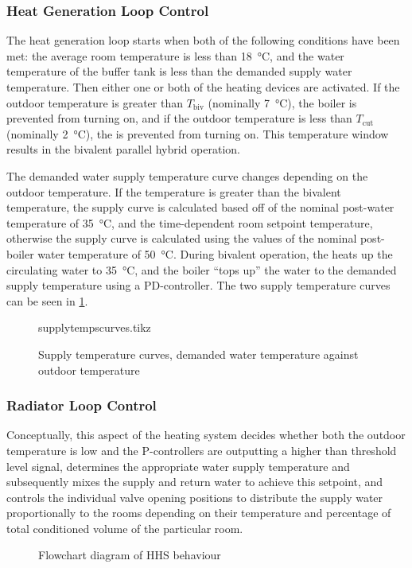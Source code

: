 \subsubsection{Heat Generation Loop Control} \label{subsubsec:heatgenloopcont}
The heat generation loop starts when both of the following conditions have been met: the average room temperature is less than \qty{18}{\celsius}, and the water temperature of the buffer tank is less than the demanded supply water temperature. Then either one or both of the heating devices are activated. If the outdoor temperature is greater than $T_\text{biv}$ (nominally \qty{7}{\celsius}), the boiler is prevented from turning on, and if the outdoor temperature is less than $T_\text{cut}$ (nominally \qty{2}{\celsius}), the \HP is prevented from turning on. This temperature window results in the bivalent parallel hybrid operation. 

The demanded water supply temperature curve changes depending on the outdoor temperature. If the temperature is greater than the bivalent temperature, the supply curve is calculated based off of the nominal post-\HP water temperature of \qty{35}{\celsius}, and the time-dependent room setpoint temperature, otherwise the supply curve is calculated using the values of the nominal post-boiler water temperature of \qty{50}{\celsius}. During bivalent operation, the \HP heats up the circulating water to \qty{35}{\celsius}, and the boiler ``tops up'' the water to the demanded supply temperature using a PD-controller. The two supply temperature curves can be seen in \cref{fig:supplytempcurves}.

\begin{figure}[htb]
    \centering
    {supplytempscurves.tikz}
    \caption{Supply temperature curves, demanded water temperature against outdoor temperature}
    \label{fig:supplytempcurves}
\end{figure}



\subsubsection{Radiator Loop Control}
Conceptually, this aspect of the heating system decides whether both the outdoor temperature is low and the P-controllers are outputting a higher than threshold level signal, determines the appropriate water supply temperature and subsequently mixes the supply and return water to achieve this setpoint, and controls the individual valve opening positions to distribute the supply water proportionally to the rooms depending on their temperature and percentage of total conditioned volume of the particular room. 


\begin{figure}[htb]
    \centering
    
    
    \caption{Flowchart diagram of \acs{HHS} behaviour}
    \label{fig:hhsflowchart}
\end{figure}
